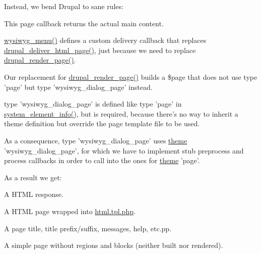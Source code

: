 Instead, we bend Drupal to sane rules:
\begin{DoxyItemize}
\item This page callback returns the actual main content.
\item \hyperlink{wysiwyg_8module_a7bbcb615ff86965ede6de1ebdaf1f360}{wysiwyg\_\-menu()} defines a custom delivery callback that replaces \hyperlink{common_8inc_a05ab0d6e81d6cbe2a6b9f645b9e710ec}{drupal\_\-deliver\_\-html\_\-page()}, just because we need to replace \hyperlink{common_8inc_ad85d021b660f070849ed7c215d9758fe}{drupal\_\-render\_\-page()}.
\item Our replacement for \hyperlink{common_8inc_ad85d021b660f070849ed7c215d9758fe}{drupal\_\-render\_\-page()} builds a \$page that does not use type 'page' but type 'wysiwyg\_\-dialog\_\-page' instead.
\item type 'wysiwyg\_\-dialog\_\-page' is defined like type 'page' in \hyperlink{system_8module_a39faa9a5430a70bb37a3c8af72460a14}{system\_\-element\_\-info()}, but is required, because there's no way to inherit a theme definition but override the page template file to be used.
\item As a consequence, type 'wysiwyg\_\-dialog\_\-page' uses \hyperlink{includes_2theme_8inc_a7c25609a935874541a19657affd30fff}{theme} 'wysiwyg\_\-dialog\_\-page', for which we have to implement stub preprocess and process callbacks in order to call into the ones for \hyperlink{includes_2theme_8inc_a7c25609a935874541a19657affd30fff}{theme} 'page'.
\end{DoxyItemize}

As a result we get:
\begin{DoxyItemize}
\item A HTML response.
\item A HTML page wrapped into \hyperlink{html_8tpl_8php}{html.tpl.php}.
\item A page title, title prefix/suffix, messages, help, etc.pp.
\item A simple page without regions and blocks (neither built nor rendered).
\end{DoxyItemize}

